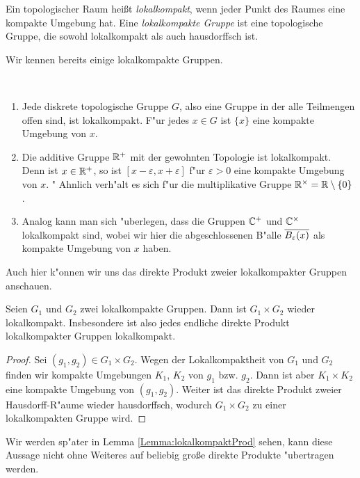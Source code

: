 	\begin{defi}
		Ein topologischer Raum heißt \emph{lokalkompakt}, wenn jeder Punkt des Raumes eine kompakte Umgebung hat. 
		Eine \emph{lokalkompakte Gruppe} ist eine topologische Gruppe, die sowohl lokalkompakt als auch hausdorffsch ist. 
	\end{defi}
	Wir kennen bereits einige lokalkompakte Gruppen.
	\begin{bsp}~ 
		\begin{enumerate}[label=(\alph*)]
			\item Jede diskrete topologische Gruppe $G$, also eine Gruppe in der alle Teilmengen offen sind, ist lokalkompakt. 
				F"ur jedes $x \in G$ ist $\{x\}$ eine kompakte Umgebung von $x$.
			\item Die additive Gruppe $\mathbb{R}^+$ mit der gewohnten Topologie ist lokalkompakt. 
				Denn ist $x\in\mathbb{R}^+$, so ist $[x-\varepsilon, x+\varepsilon]$ f"ur $\varepsilon>0$ eine kompakte Umgebung von $x$. "
				Ahnlich verh"alt es sich f"ur die multiplikative Gruppe $\mathbb{R}^\times = \mathbb{R} \setminus\{0\}$.
			\item Analog kann man sich "uberlegen, dass die Gruppen $\mathbb{C}^+$ und $\mathbb{C}^\times$ lokalkompakt sind, wobei wir hier die abgeschlossenen B"alle $\overline{B_\varepsilon(x)}$ als kompakte Umgebung von $x$ haben.
		\end{enumerate}
	\end{bsp}
	Auch hier k"onnen wir uns das direkte Produkt zweier lokalkompakter Gruppen anschauen. 
	\begin{lemma}\label{satz:topo:lcaproduct}
		Seien $G_1$ und $G_2$ zwei lokalkompakte Gruppen. 
		Dann ist $G_1\times G_2$ wieder lokalkompakt. 
		Insbesondere ist also jedes endliche direkte Produkt lokalkompakter Gruppen lokalkompakt.
	\end{lemma}
	\begin{proof}
		Sei $(g_1,g_2) \in G_1\times G_2$. Wegen der Lokalkompaktheit von $G_1$ und $G_2$ finden wir kompakte Umgebungen $K_1$, $K_2$ von $g_1$ bzw. $g_2$. Dann ist aber $K_1 \times K_2$ eine kompakte Umgebung von $(g_1,g_2)$. 
		Weiter ist das direkte Produkt zweier Hausdorff-R"aume wieder hausdorffsch, wodurch $G_1\times G_2$ zu einer lokalkompakten Gruppe wird.
	\end{proof}
	Wir werden sp"ater in Lemma \ref{Lemma:lokalkompaktProd} sehen, kann diese Aussage nicht ohne Weiteres auf beliebig große direkte Produkte "ubertragen werden.

